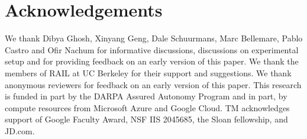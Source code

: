 \documentclass{article} %
\begin{document}

\section*{Acknowledgements}
We thank Dibya Ghosh, Xinyang Geng, Dale Schuurmans, Marc Bellemare, Pablo Castro and Ofir Nachum for informative discussions, discussions on experimental setup and for providing feedback on an early version of this paper. We thank the members of RAIL at UC Berkeley for their support and suggestions. We thank anonymous reviewers for feedback on an early version of this paper. This research is funded in part by the DARPA Assured Autonomy Program and in part, by compute resources from Microsoft Azure and Google Cloud. TM acknowledges support of Google Faculty Award, NSF IIS 2045685, the Sloan fellowship, and JD.com. 




\appendix
\newpage

\end{document}
